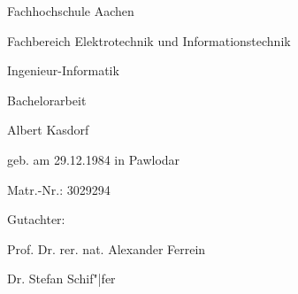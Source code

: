 %
%
% 
\begin{titlepage}
	\newlength
	\logoheight
	\settoheight
	\thispagestyle{empty}

	\vspace*{\fill}
	\centering
	\normalsize
	Fachhochschule Aachen\par
	Fachbereich Elektrotechnik und Informationstechnik\par
	Ingenieur-Informatik\par
	\vspace{0.5cm}
	Bachelorarbeit\par
	\Huge
	\thetitle\par
	\normalsize
	\vspace{0.5cm}
	Albert Kasdorf\par
	geb. am 29.12.1984 in Pawlodar\par
	Matr.-Nr.: 3029294\par
	\vspace{0.5cm}
	Gutachter:\par
	Prof. Dr. rer. nat. Alexander Ferrein\par
	Dr. Stefan Schif"|fer\par
	\vspace{\fill}
\end{titlepage}